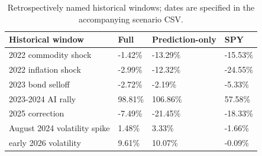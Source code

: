 \begin{table}[htbp]
\caption{Retrospectively named historical windows; dates are specified in the accompanying scenario CSV.}
\label{tab:scenarios}
\begin{tabular}{llll}
\toprule
Historical window & Full & Prediction-only & SPY \\
\midrule
2022 commodity shock & -1.42\% & -13.29\% & -15.53\% \\
2022 inflation shock & -2.99\% & -12.32\% & -24.55\% \\
2023 bond selloff & -2.72\% & -2.19\% & -5.33\% \\
2023-2024 AI rally & 98.81\% & 106.86\% & 57.58\% \\
2025 correction & -7.49\% & -21.45\% & -18.33\% \\
August 2024 volatility spike & 1.48\% & 3.33\% & -1.66\% \\
early 2026 volatility & 9.61\% & 10.07\% & -0.09\% \\
\bottomrule
\end{tabular}
\end{table}
